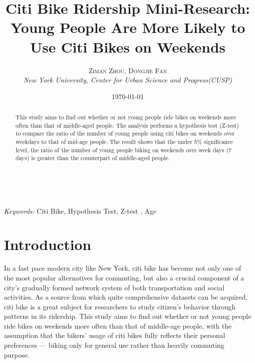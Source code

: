 \documentclass[a4paper, 11pt]{article} %
\title{\textbf{Citi Bike Ridership Mini-Research:}\\ %
{Young People Are More Likely to Use Citi Bikes on Weekends} }%
\author{\textsc{Ziman Zhou, Dongjie Fan} %
\\{\textit{New York University, Center for Urban Science and Progress(CUSP)}}} %
\date{\today} %
\makeatletter
\renewcommand{\maketitle}{ %
\begin{flushright} %
{\LARGE\@title} %

\vspace{50pt} %

{\large\@author} %
\\\@date %

\vspace{40pt} %
\end{flushright}
}
\makeatother
\begin{document}
\maketitle %



\begin{abstract}
This study aims to find out whether or not young people ride bikes on weekends more often than that of middle-aged people. The analysis performs a hypothesis test (Z-test) to compare the ratio of the number of young people using citi bikes on weekends over weekdays to that of mid-age people. The result shows that the under 5\% significance level, the ratio of the number of young people biking on weekends over week days (7 days) is greater than the counterpart of middle-aged people.
\end{abstract}

\hspace*{3,6mm}\textit{Keywords:} Citi Bike, Hypothesis Test, Z-test , Age %

\vspace{30pt} %


\section*{Introduction}

In a fast pace modern city like New York, citi bike has become not only one of the most popular alternatives for commuting, but also a crucial component of a city's gradually formed network system of both transportation and social activities. As a source from which quite comprehensive datasets can be acquired, citi bike is a great subject for researchers to study citizen's behavior through patterns in its ridership. This study aims to find out whether or not young people ride bikes on weekends more often than that of middle-age people, with the assumption that the bikers' usage of citi bikes fully reflects their personal preferences --- biking only for general use rather than heavily commuting purpose. 
\end{document}
